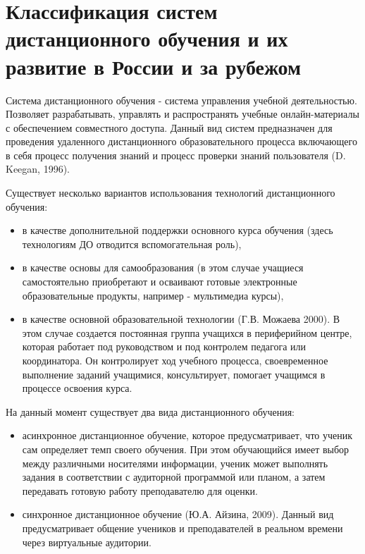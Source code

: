 \section{Классификация систем дистанционного обучения и их развитие в России и за рубежом} \label{sect1_2}

Система дистанционного обучения - система управления учебной деятельностью. Позволяет разрабатывать, управлять и распространять учебные онлайн-материалы с обеспечением совместного доступа. Данный вид систем предназначен для проведения удаленного дистанционного образовательного процесса включающего в себя процесс получения знаний и процесс проверки знаний пользователя (D. Keegan, 1996).

Существует несколько вариантов использования технологий дистанционного обучения:

\begin{itemize}
\item в качестве дополнительной поддержки основного курса обучения (здесь технологиям ДО отводится вспомогательная роль),
\item в качестве основы для самообразования (в этом случае учащиеся самостоятельно приобретают и осваивают готовые электронные образовательные продукты, например - мультимедиа курсы),
\item в качестве основной образовательной технологии (Г.В. Можаева 2000). В этом случае создается постоянная группа учащихся в периферийном центре, которая работает под руководством и под контролем педагога или координатора. Он контролирует ход учебного процесса, своевременное выполнение заданий учащимися, консультирует, помогает учащимся в процессе освоения курса.
\end{itemize}

На данный момент существует два вида дистанционного обучения: 

\begin{itemize}
\item асинхронное дистанционное обучение, которое предусматривает, что ученик сам определяет темп своего обучения. При этом обучающийся имеет выбор между различными носителями информации, ученик может выполнять задания в соответствии с аудиторной программой или планом, а затем передавать готовую работу преподавателю для оценки.
\item синхронное дистанционное обучение (Ю.А. Айзина, 2009). Данный вид предусматривает общение учеников и преподавателей в реальном времени через виртуальные аудитории. 
\end{itemize}

